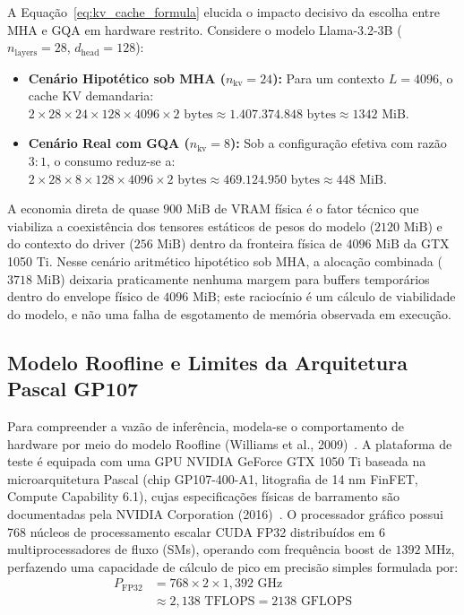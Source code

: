 \documentclass[10pt,a4paper,twocolumn]{article}
\begin{document}
A Equa\c{c}\~ao~\eqref{eq:kv_cache_formula} elucida o impacto decisivo da escolha entre MHA e GQA em hardware restrito. Considere o modelo Llama-3.2-3B ($n_{\text{layers}} = 28$, $d_{\text{head}} = 128$):
\begin{itemize}[leftmargin=2em,itemsep=0.2em]
    \item \textbf{Cen\'ario Hipot\'etico sob MHA ($n_{\text{kv}} = 24$):} Para um contexto $L = 4096$, o cache KV demandaria:
    $2 \times 28 \times 24 \times 128 \times 4096 \times 2\text{ bytes} \approx 1.407.374.848\text{ bytes} \approx 1342\text{ MiB}$.
    \item \textbf{Cen\'ario Real com GQA ($n_{\text{kv}} = 8$):} Sob a configura\c{c}\~ao efetiva com raz\~ao $3:1$, o consumo reduz-se a:
    $2 \times 28 \times 8 \times 128 \times 4096 \times 2\text{ bytes} \approx 469.124.950\text{ bytes} \approx 448\text{ MiB}$.
\end{itemize}
A economia direta de quase $900\text{ MiB}$ de VRAM f\'isica \'e o fator t\'ecnico que viabiliza a coexist\^encia dos tensores est\'aticos de pesos do modelo ($2120\text{ MiB}$) e do contexto do driver ($256\text{ MiB}$) dentro da fronteira f\'isica de $4096\text{ MiB}$ da GTX 1050 Ti. Nesse cen\'ario aritm\'etico hipot\'etico sob MHA, a aloca\c{c}\~ao combinada ($3718\text{ MiB}$) deixaria praticamente nenhuma margem para buffers tempor\'arios dentro do envelope f\'isico de $4096\text{ MiB}$; este racioc\'inio \'e um c\'alculo de viabilidade do modelo, e n\~ao uma falha de esgotamento de mem\'oria observada em execu\c{c}\~ao.

\subsection{Modelo Roofline e Limites da Arquitetura Pascal GP107}

Para compreender a vaz\~ao de infer\^encia, modela-se o comportamento de hardware por meio do modelo Roofline (Williams et al., 2009)~\cite{williams2009}. A plataforma de teste \'e equipada com uma GPU NVIDIA GeForce GTX 1050 Ti baseada na microarquitetura Pascal (chip GP107-400-A1, litografia de 14 nm FinFET, Compute Capability 6.1), cujas especifica\c{c}\~oes f\'isicas de barramento s\~ao documentadas pela NVIDIA Corporation (2016)~\cite{nvidia2016pascal}. O processador gr\'afico possui 768 n\'ucleos de processamento escalar CUDA FP32 distribu\'idos em 6 multiprocessadores de fluxo (SMs), operando com frequ\^encia boost de $1392\text{ MHz}$, perfazendo uma capacidade de c\'alculo de pico em precis\~ao simples formulada por:
\begin{equation}
 \begin{aligned}
 P_{\text{FP32}} &= 768 \times 2 \times 1,392\text{ GHz}\\
 &\approx 2,138\text{ TFLOPS} = 2138\text{ GFLOPS}
 \end{aligned}
\end{equation}
\end{document}
